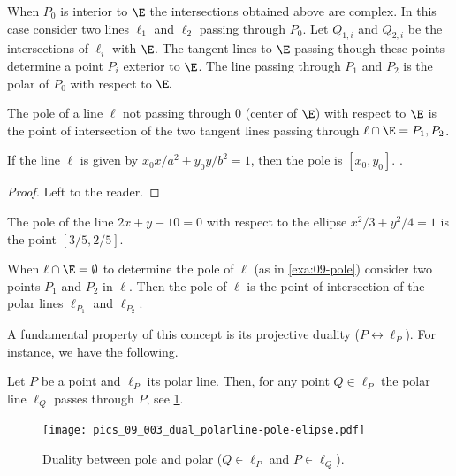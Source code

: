   \begin{remark} When $P_0$ is interior to $\E$ the intersections obtained above are complex.
  In this case consider two lines $\ell_1$ and $\ell_2$ passing through $P_0$. Let $Q_{1,i} $ and $Q_{2,i} $ be the intersections of $\ell_i$ with $\E$. The   tangent lines to $\E$ passing though these points determine a point $P_i$ exterior to $\E$. The line passing through $P_1$ and $P_2$ is the polar of $P_0$ with respect to $\E.$  
  \end{remark}
\begin{definition}
The pole of a line $\ell$ not passing through $0$ (center of $\E$) with respect to $\E$ is the point of  intersection of the two tangent lines passing through  $\ell\cap\E={P_1,P_2}$.
\label{def:09-pole}
\end{definition}

\begin{lemma} If the line $\ell$ is given by $x_0 x /a^2+y_0y/b^2=1$, then the pole is $[x_0,y_0]$.
\label{lem:09-polar}.
\end{lemma}
\begin{proof}
Left to the reader.
\end{proof}

\begin{example} The pole of the line $2x+y-10=0$ with respect to the ellipse $x^2/3+y^2/4=1$ is the point
$[3/5,2/5]$.
\label{exa:09-pole}
\end{example}

\begin{remark}
When $\ell\cap\E=\emptyset $ to determine the pole of $\ell$ (as in   \cref{exa:09-pole}) consider two points $P_1$ and $P_2$ in $\ell$. Then the pole of $\ell$ is the point
of intersection of the polar lines $\ell_{P_1}$ and $\ell_{P_2}$.
\end{remark}

A fundamental property of this concept is its projective duality ($P \leftrightarrow \ell_P$). For instance, we have the following.
\begin{proposition} 
    Let $P$ be a point and $\ell_P$ its polar line. Then, for any point $Q\in \ell_P$ the polar line $\ell_Q$ passes through $P$,   see \cref{fig:pics-09-polarpole-ellipse}.
    \label{prop:09-pole-polar}
\end{proposition}

\begin{figure}
    \centering
    \texttt{[image: pics\_09\_003\_dual\_polarline-pole-elipse.pdf]}
    \caption{Duality between pole and polar ($Q \in \ell_P$ and $P\in \ell_Q$).}
    \label{fig:pics-09-polarpole-ellipse}
\end{figure}

